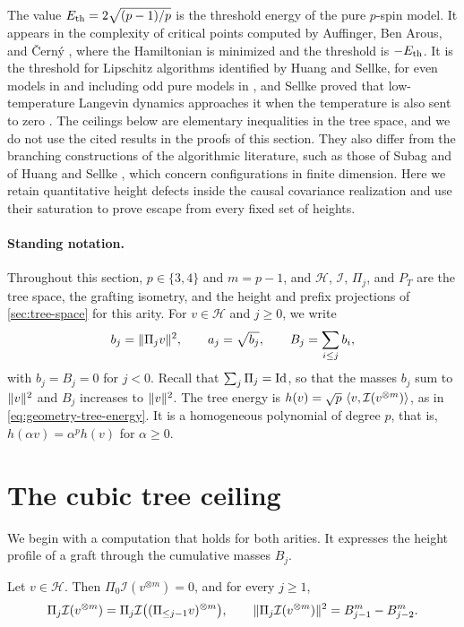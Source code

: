 The value $E_{\mathrm{th}}=2\sqrt{(p-1)/p}$ is the threshold energy of the pure $p$-spin model. It appears in the complexity of critical points computed by Auffinger, Ben Arous, and \v{C}ern\'y \cite[equation~(2.13)]{abc2013}, where the Hamiltonian is minimized and the threshold is $-E_{\mathrm{th}}$. It is the threshold for Lipschitz algorithms identified by Huang and Sellke, for even models in \cite{hs2021} and including odd pure models in \cite[Theorem~1 and Corollary~1.8]{hs2023}, and Sellke proved that low-temperature Langevin dynamics approaches it when the temperature is also sent to zero \cite[Theorems~1.1 and~1.7]{sellke2024}. The ceilings below are elementary inequalities in the tree space, and we do not use the cited results in the proofs of this section. They also differ from the branching constructions of the algorithmic literature, such as those of Subag \cite[Remark~6]{subag2021} and of Huang and Sellke \cite[Remarks~1.2--1.3 and Sections~3 and~7]{hs2021}, which concern configurations in finite dimension. Here we retain quantitative height defects inside the causal covariance realization and use their saturation to prove escape from every fixed set of heights.

\paragraph{Standing notation.}
Throughout this section, $p\in\{3,4\}$ and $m=p-1$, and $\mathcal H$, $\mathcal I$, $\Pi_j$, and $P_T$ are the tree space, the grafting isometry, and the height and prefix projections of \cref{sec:tree-space} for this arity. For $v\in\mathcal H$ and $j\ge0$, we write
\[
 b_j=\lVert\Pi_jv\rVert^2,\qquad a_j=\sqrt{b_j},\qquad B_j=\sum_{i\le j}b_i,
\]
with $b_j=B_j=0$ for $j<0$. Recall that $\sum_j\Pi_j=\operatorname{Id}$, so that the masses $b_j$ sum to $\lVert v\rVert^2$ and $B_j$ increases to $\lVert v\rVert^2$. The tree energy is $h(v)=\sqrt p\,\left\langle v,\mathcal I(v^{\otimes m})\right\rangle$, as in \eqref{eq:geometry-tree-energy}. It is a homogeneous polynomial of degree $p$, that is, $h(\alpha v)=\alpha^ph(v)$ for $\alpha\ge0$.

\section{The cubic tree ceiling}\label{sec:tree-cubic-ceiling}

We begin with a computation that holds for both arities. It expresses the height profile of a graft through the cumulative masses $B_j$.

\begin{lemma}\label{lem:tree-graft-heights}
Let $v\in\mathcal H$. Then $\Pi_0\mathcal I(v^{\otimes m})=0$, and for every $j\ge1$,
\begin{equation}\label{eq:tree-graft-heights}
 \Pi_j\mathcal I(v^{\otimes m})=\Pi_j\mathcal I\bigl((\Pi_{\le j-1}v)^{\otimes m}\bigr),\qquad
 \lVert\Pi_j\mathcal I(v^{\otimes m})\rVert^2=B_{j-1}^m-B_{j-2}^m.
\end{equation}
\end{lemma}

